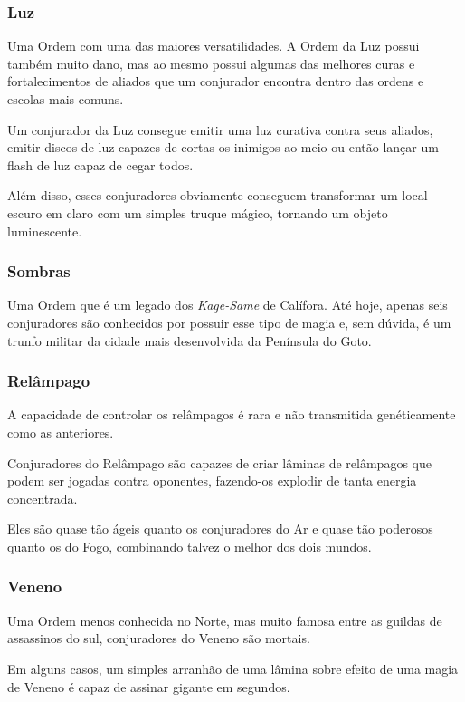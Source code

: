 \begin{multicols}{2}
\subsubsection*{Luz}%

Uma Ordem com uma das maiores versatilidades. A Ordem da Luz possui também muito
dano, mas ao mesmo possui algumas das melhores curas e fortalecimentos de
aliados que um conjurador encontra dentro das ordens e escolas mais comuns.

Um conjurador da Luz consegue emitir uma luz curativa contra seus aliados,
emitir discos de luz capazes de cortas os inimigos ao meio ou então lançar um
flash de luz capaz de cegar todos.

Além disso, esses conjuradores obviamente conseguem transformar um local escuro
em claro com um simples truque mágico, tornando um objeto luminescente.

\subsubsection*{Sombras}%

Uma Ordem que é um legado dos \textit{Kage-Same} de Calífora. Até hoje, apenas
seis conjuradores são conhecidos por possuir esse tipo de magia e, sem dúvida, é
um trunfo militar da cidade mais desenvolvida da Península do Goto.

\subsubsection*{Relâmpago}%

A capacidade de controlar os relâmpagos é rara e não transmitida genéticamente
como as anteriores.

Conjuradores do Relâmpago são capazes de criar lâminas de relâmpagos que podem
ser jogadas contra oponentes, fazendo-os explodir de tanta energia concentrada.

Eles são quase tão ágeis quanto os conjuradores do Ar e quase tão poderosos
quanto os do Fogo, combinando talvez o melhor dos dois mundos.

\subsubsection*{Veneno}%

Uma Ordem menos conhecida no Norte, mas muito famosa entre as guildas de
assassinos do sul, conjuradores do Veneno são mortais.

Em alguns casos, um simples arranhão de uma lâmina sobre efeito de uma magia de
Veneno é capaz de assinar gigante em segundos.


\end{multicols}
